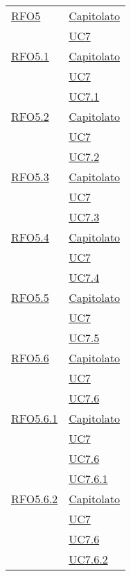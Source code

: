 \begin{longtable}{|>{\centering}m{5cm}|m{5cm}<{\centering}|}
\hyperlink{RFO5}{RFO5} & \hyperlink{Capitolato}{Capitolato}\\
& \hyperref[UC7]{UC7}\\ \hline


\hyperlink{RFO5.1}{RFO5.1} & \hyperlink{Capitolato}{Capitolato}\\
& \hyperref[UC7]{UC7}\\
& \hyperref[UC7.1]{UC7.1}\\ \hline

\hyperlink{RFO5.2}{RFO5.2} & \hyperlink{Capitolato}{Capitolato}\\
& \hyperref[UC7]{UC7}\\
& \hyperref[UC7.2]{UC7.2}\\ \hline

\hyperlink{RFO5.3}{RFO5.3} & \hyperlink{Capitolato}{Capitolato}\\
& \hyperref[UC7]{UC7}\\
& \hyperref[UC7.3]{UC7.3}\\ \hline

\hyperlink{RFO5.4}{RFO5.4} & \hyperlink{Capitolato}{Capitolato}\\
& \hyperref[UC7]{UC7}\\
& \hyperref[UC7.4]{UC7.4}\\ \hline

\hyperlink{RFO5.5}{RFO5.5} & \hyperlink{Capitolato}{Capitolato}\\
& \hyperref[UC7]{UC7}\\
& \hyperref[UC7.5]{UC7.5}\\ \hline

\hyperlink{RFO5.6}{RFO5.6} & \hyperlink{Capitolato}{Capitolato}\\
& \hyperref[UC7]{UC7}\\
& \hyperref[UC7.6]{UC7.6}\\ \hline

\hyperlink{RFO5.6.1}{RFO5.6.1} & \hyperlink{Capitolato}{Capitolato}\\
& \hyperref[UC7]{UC7}\\
& \hyperref[UC7.6]{UC7.6}\\
& \hyperref[UC7.6.1]{UC7.6.1}\\ \hline

\hyperlink{RFO5.6.2}{RFO5.6.2} & \hyperlink{Capitolato}{Capitolato}\\
& \hyperref[UC7]{UC7}\\
& \hyperref[UC7.6]{UC7.6}\\
& \hyperref[UC7.6.2]{UC7.6.2}\\ \hline


\end{longtable}
